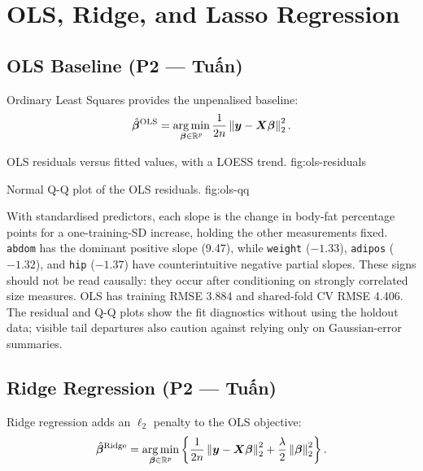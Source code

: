 \section{OLS, Ridge, and Lasso Regression}
\label{sec:ols-ridge-lasso}

\subsection{OLS Baseline (P2 — Tuấn)}
\label{sec:ols}

Ordinary Least Squares provides the unpenalised baseline:
\[
    \hat{\bm{\beta}}^{\mathrm{OLS}}
    = \operatorname*{arg\,min}_{\bm{\beta} \in \mathbb{R}^p} \frac{1}{2n}\left\lVert \bm{y} - \bm{X} \bm{\beta} \right\rVert_2^2.
\]



%
    {OLS residuals versus fitted values, with a LOESS trend.}%
    {fig:ols-residuals}

%
    {Normal Q-Q plot of the OLS residuals.}%
    {fig:ols-qq}

With standardised predictors, each slope is the change in body-fat percentage
points for a one-training-SD increase, holding the other measurements fixed.
\texttt{abdom} has the dominant positive slope (9.47), while \texttt{weight}
($-1.33$), \texttt{adipos} ($-1.32$), and \texttt{hip} ($-1.37$) have
counterintuitive negative partial slopes.  These signs should not be read
causally: they occur after conditioning on strongly correlated size measures.
OLS has training RMSE 3.884 and shared-fold CV RMSE 4.406.  The residual and
Q-Q plots show the fit diagnostics without using the holdout data; visible tail
departures also caution against relying only on Gaussian-error summaries.

\subsection{Ridge Regression (P2 — Tuấn)}
\label{sec:ridge}

Ridge regression adds an $\ell_2$ penalty to the OLS objective:
\[
    \hat{\bm{\beta}}^{\mathrm{Ridge}}
    = \operatorname*{arg\,min}_{\bm{\beta} \in \mathbb{R}^p}
      \left\{
          \frac{1}{2n}\left\lVert \bm{y} - \bm{X} \bm{\beta} \right\rVert_2^2
          + \frac{\lambda}{2} \left\lVert \bm{\beta} \right\rVert_2^2
      \right\}.
\]


